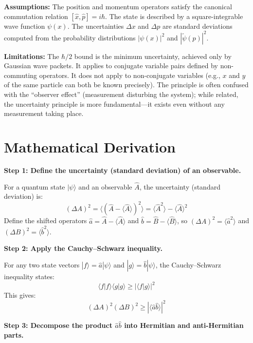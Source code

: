 \documentclass[11pt,openright]{book}
\begin{document}
\textbf{Assumptions:} The position and momentum operators satisfy the canonical commutation relation $[\hat{x},\hat{p}] = i\hbar$. The state is described by a square-integrable wave function $\psi(x)$. The uncertainties $\Delta x$ and $\Delta p$ are standard deviations computed from the probability distributions $|\psi(x)|^2$ and $|\tilde{\psi}(p)|^2$.


\textbf{Limitations:} The $\hbar/2$ bound is the minimum uncertainty, achieved only by Gaussian wave packets. It applies to conjugate variable pairs defined by non-commuting operators. It does not apply to non-conjugate variables (e.g., $x$ and $y$ of the same particle can both be known precisely). The principle is often confused with the ``observer effect'' (measurement disturbing the system); while related, the uncertainty principle is more fundamental---it exists even without any measurement taking place.


\section*{Mathematical Derivation}

\textbf{Step 1: Define the uncertainty (standard deviation) of an observable.}

For a quantum state $|\psi\rangle$ and an observable $\hat{A}$, the uncertainty (standard deviation) is:
\begin{equation}
(\Delta A)^2 = \langle(\hat{A}-\langle\hat{A}\rangle)^2\rangle = \langle\hat{A}^2\rangle - \langle\hat{A}\rangle^2
\end{equation}
Define the shifted operators $\hat{a} = \hat{A} - \langle\hat{A}\rangle$ and $\hat{b} = \hat{B} - \langle\hat{B}\rangle$, so $(\Delta A)^2 = \langle\hat{a}^2\rangle$ and $(\Delta B)^2 = \langle\hat{b}^2\rangle$.

\textbf{Step 2: Apply the Cauchy--Schwarz inequality.}

For any two state vectors $|f\rangle = \hat{a}|\psi\rangle$ and $|g\rangle = \hat{b}|\psi\rangle$, the Cauchy--Schwarz inequality states:
\begin{equation}
\langle f|f\rangle\langle g|g\rangle \geq |\langle f|g\rangle|^2
\end{equation}
This gives:
\begin{equation}
(\Delta A)^2(\Delta B)^2 \geq |\langle\hat{a}\hat{b}\rangle|^2
\end{equation}

\textbf{Step 3: Decompose the product $\hat{a}\hat{b}$ into Hermitian and anti-Hermitian parts.}
\end{document}
